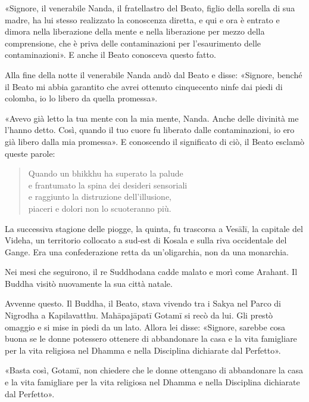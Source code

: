 «Signore, il venerabile Nanda, il fratellastro del Beato, figlio della sorella
di sua madre, ha lui stesso realizzato la conoscenza diretta, e qui e ora è
entrato e dimora nella liberazione della mente e nella liberazione per mezzo
della comprensione, che è priva delle contaminazioni per l’esaurimento delle
contaminazioni». E anche il Beato conosceva questo fatto.

Alla fine della notte il venerabile Nanda andò dal Beato e disse: «Signore,
benché il Beato mi abbia garantito che avrei ottenuto cinquecento ninfe dai
piedi di colomba, io lo libero da quella promessa».

«Avevo già letto la tua mente con la mia mente, Nanda. Anche delle divinità me
l’hanno detto. Così, quando il tuo cuore fu liberato dalle contaminazioni, io
ero già libero dalla mia promessa». E conoscendo il significato di ciò, il Beato
esclamò queste parole:

\begin{quote}
Quando un bhikkhu ha superato la palude \\
e frantumato la spina dei desideri sensoriali \\
e raggiunto la distruzione dell’illusione, \\
piaceri e dolori non lo scuoteranno più.
\end{quote}


 La successiva stagione delle piogge, la quinta, fu
trascorsa a Vesālī, la capitale del Videha, un territorio collocato a sud-est di
Kosala e sulla riva occidentale del Gange. Era una confederazione retta da
un’oligarchia, non da una monarchia.

 Nei mesi che seguirono, il re Suddhodana cadde
malato e morì come Arahant. Il Buddha visitò nuovamente la sua città natale.

 Avvenne questo. Il Buddha, il Beato, stava vivendo tra i
Sakya nel Parco di Nigrodha a Kapilavatthu. Mahāpajāpatī Gotamī si recò da lui.
Gli prestò omaggio e si mise in piedi da un lato. Allora lei disse: «Signore,
sarebbe cosa buona se le donne potessero ottenere di abbandonare la casa e la
vita famigliare per la vita religiosa nel Dhamma e nella Disciplina dichiarate
dal Perfetto».

«Basta così, Gotamī, non chiedere che le donne ottengano di abbandonare la casa
e la vita famigliare per la vita religiosa nel Dhamma e nella Disciplina
dichiarate dal Perfetto».

